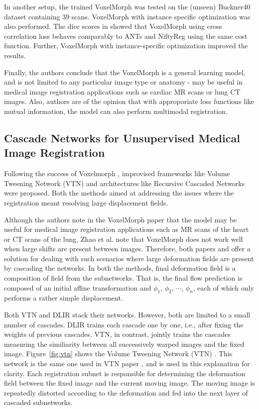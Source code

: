 \documentclass{book}
\begin{document}
	In another setup, the trained VoxelMorph was tested on the (unseen) Buckner40 dataset containing 39 scans. VoxelMorph with instance specific optimization was also performed. The dice scores in showed that VoxelMorph using cross correlation loss behaves comparably to ANTs and NiftyReg using the same cost function. Further, VoxelMorph with instance-specific optimization improved the results.
	
	Finally, the authors conclude that the VoxelMorph is a general learning model, and is not limited to any particular image type or anatomy - may be useful in medical image registration applications such as cardiac MR scans or lung CT images. Also, authors are of the opinion that with approporiate loss functions like mutual information, the model can also perform multimodal registration.
	
	\subsection{Cascade Networks for Unsupervised Medical Image Registration}
	Following the success of Voxelmorph \cite{Balakrishnan_2019}, improvised frameworks like Volume Tweening Network (VTN) \cite{8889674} and architectures like Recursive Cascaded Networks \cite{Zhao_2019} were proposed. Both the methods aimed at addressing the issues where the registration meant resolving large displacement fields.
	
	Although the authors note in the VoxelMorph paper \cite{Balakrishnan_2019} that the model may be useful for medical image registration applications such as MR scans of the heart or CT scans of the lung, Zhao et al. \cite{8889674} note that VoxelMorph does not work well when large shifts are present between images. Therefore, both papers \cite{8889674} and \cite{Balakrishnan_2019} offer a solution for dealing with such scenarios where large deformation fields are present by cascading the networks. In both the methods, final deformation field is a composition of field from the subnetworks. That is, the final flow prediction is composed of an initial affine transformation and $\phi_1$, $\phi_2$, $\cdots$, $\phi_n$, each of which only performs a rather simple displacement.
	
	Both VTN \cite{8889674} and DLIR \cite{de_Vos_2019} stack their networks. However, both are limited to a small number of cascades. DLIR trains each cascade one by one, i.e., after fixing the weights of previous cascades. VTN, in contrast, jointly trains the cascades measuring the similiarity between all successively warped images and the fixed image. Figure~\ref{fig:vtn} shows the Volume Tweening Network (VTN) \cite{8889674}. This network is the same one used in VTN paper \cite{8889674}, and is used in this explanation for clarity. Each registration subnet is responsible for determining the deformation field between the fixed image and the current moving image. The moving image is repeatedly distorted according to the deformation and fed into the next layer of cascaded subnetworks.
	
\end{document}

